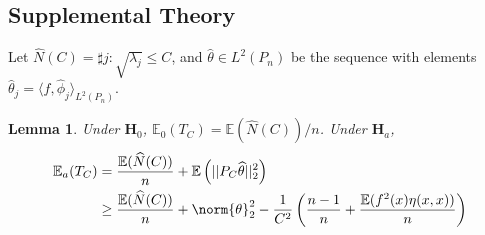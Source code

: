 \documentclass{article}
\newcommand{\dotp}[2]{\langle #1, #2 \rangle}
\newcommand{\1}{\mathbb{I}}
\newcommand{\Ebb}{\mathbb{E}}
\theoremstyle{alden}
\theoremstyle{aldenthm}
\newtheorem{lemma}{Lemma}
\theoremstyle{definition}
\theoremstyle{remark}
\begin{document}
\subsection{Supplemental Theory}
Let $\widehat{N}(C) = \sharp{j: \sqrt{\lambda_j} \leq C}$, and $\widehat{\theta} \in L^2(P_n)$ be the sequence with elements $\widehat{\theta}_j = \dotp{f}{\widehat{\phi}_j}_{L^2(P_n)}$. 
\begin{lemma}
	\label{lem: expectation_eigenvector}
	Under $\mathbf{H}_0$, $\Ebb_0(T_C) = \Ebb(\widehat{N}(C))/n$. Under $\mathbf{H}_a$,
	\begin{align}
	\Ebb_a(T_C) & = \frac{\Ebb(\widehat{N}(C))}{n} + \Ebb\left(||P_C \widehat{\theta}||_2^2\right) \label{eqn:expectation_eigenvector}\\
	& \geq \frac{\Ebb(\widehat{N}(C))}{n} + \norm{\theta}_2^2 - \frac{1}{C^2} \left(\frac{n - 1}{n} + \frac{\Ebb(f^2(x) \eta(x,x))}{n}\right) \label{eqn:expectation_eigenvector_2}
	\end{align}
\end{lemma}
\end{document}
